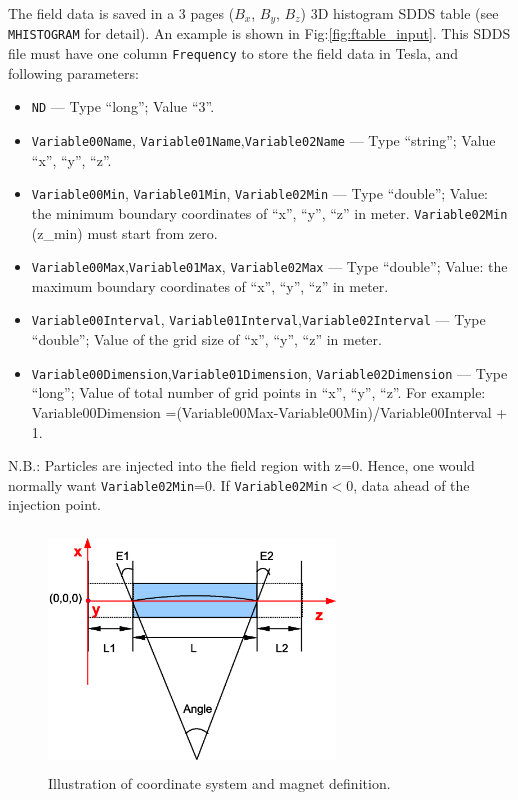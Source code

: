The field data is saved in a 3 pages ($B_x$,
$B_y$, $B_z$) 3D histogram SDDS table (see \verb|MHISTOGRAM| for detail).
An example is shown in Fig:\ref{fig:ftable_input}.
This SDDS file must have one column \verb|Frequency| to store the
field data in Tesla, and following parameters:

\begin{itemize} 
\item \verb|ND| --- Type ``long''; Value ``3''.
\item \verb|Variable00Name|, \verb|Variable01Name|,\verb|Variable02Name| 
      --- Type ``string''; Value ``x'', ``y'', ``z''.
\item \verb|Variable00Min|, \verb|Variable01Min|, \verb|Variable02Min|
      --- Type ``double''; Value: the minimum boundary coordinates of
      ``x'', ``y'', ``z'' in meter. \verb|Variable02Min| (z\_min) must start from zero.
\item \verb|Variable00Max|,\verb|Variable01Max|, \verb|Variable02Max| 
      --- Type ``double''; Value: the maximum boundary coordinates of 
      ``x'', ``y'', ``z'' in meter.
\item \verb|Variable00Interval|, \verb|Variable01Interval|,\verb|Variable02Interval|
      --- Type ``double''; Value of the grid size of ``x'', ``y'', ``z'' in meter.  
\item \verb|Variable00Dimension|,\verb|Variable01Dimension|, \verb|Variable02Dimension|
      --- Type ``long''; Value of total number of grid points in
      ``x'', ``y'', ``z''.  For example: Variable00Dimension
      =(Variable00Max-Variable00Min)/Variable00Interval + 1.
\end{itemize}

N.B.: Particles are injected into the field region with z=0. Hence, one would normally want
\verb|Variable02Min|=0. If \verb|Variable02Min|$<$0, data ahead of the injection point.

\begin{figure}[htbp] 
  \begin{center}
  \includegraphics[width=3in,height=2.5in]{ftable-fig1}
  \caption{\label{fig:ftable_mag} Illustration of coordinate
      system and magnet definition.}  
   \end{center} 
\end{figure}

